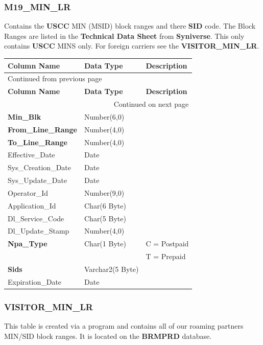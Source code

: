\documentclass[12pt,twoside]{article}
\begin{document}
\subsubsection{M19\_MIN\_LR}
\label{sec:orgheadline106}
Contains the \textbf{USCC} MIN (MSID) block ranges and there \textbf{SID}
code. The Block Ranges are listed in the \textbf{Technical Data Sheet}
from \textbf{Syniverse}. This only contains \textbf{USCC} MINS only. For
foreign carriers see the \textbf{VISITOR\_MIN\_LR}.
\footnotesize

\begin{longtable}{l|l|l}
\hline
\textbf{Column Name} & \textbf{Data Type} & \textbf{Description}\\
\hline
\endfirsthead
\multicolumn{3}{l}{Continued from previous page} \\
\hline

\textbf{Column Name} & \textbf{Data Type} & \textbf{Description} \\

\hline
\endhead
\hline\multicolumn{3}{r}{Continued on next page} \\
\endfoot
\endlastfoot
\hline
\textbf{Min\_Blk} & Number(6,0) & \\
\textbf{From\_Line\_Range} & Number(4,0) & \\
\textbf{To\_Line\_Range} & Number(4,0) & \\
Effective\_Date & Date & \\
Sys\_Creation\_Date & Date & \\
Sys\_Update\_Date & Date & \\
Operator\_Id & Number(9,0) & \\
Application\_Id & Char(6 Byte) & \\
Dl\_Service\_Code & Char(5 Byte) & \\
Dl\_Update\_Stamp & Number(4,0) & \\
\textbf{Npa\_Type} & Char(1 Byte) & C = Postpaid\\
&  & T = Prepaid\\
\textbf{Sids} & Varchar2(5 Byte) & \\
Expiration\_Date & Date & \\
\hline
\end{longtable}

\normalsize

\subsubsection{VISITOR\_MIN\_LR}
\label{sec:orgheadline107}
This table is created via a program and contains all of our
roaming partners MIN/SID block ranges. It is located on the
\textbf{BRMPRD} database.
\end{document}
